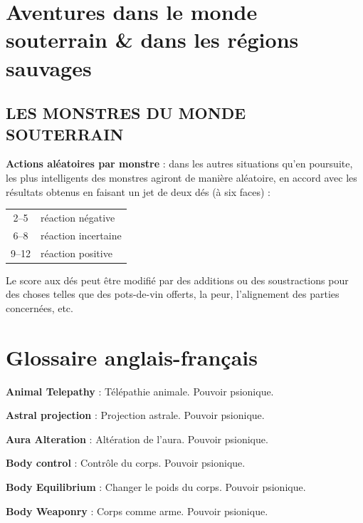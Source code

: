 \documentclass[11pt]{article}
\begin{document}
{{}%

\newpage
\section*{Aventures dans le monde souterrain \& dans les régions sauvages}

\subsection*{LES MONSTRES DU MONDE SOUTERRAIN}

\textbf{Actions aléatoires par monstre} : dans les autres situations qu'en poursuite, les plus intelligents des monstres agiront de manière aléatoire, en accord avec les résultats obtenus en faisant un jet de deux dés (à six faces) :

\bigskip

{\parindent6cm \begin{tabular}{cl}
2--5 & réaction négative \\
6--8 & réaction incertaine \\
9--12 & réaction positive \\
\end{tabular}}

\medskip

Le score aux dés peut être modifié par des additions ou des soustractions pour des choses telles que des pots-de-vin offerts, la peur, l'alignement des parties concernées, etc.


\newpage
\section*{Glossaire anglais-français }

{\parindent0cm

\textbf{Animal Telepathy} : Télépathie animale. Pouvoir psionique.

\textbf{Astral projection} : Projection astrale. Pouvoir psionique.

\textbf{Aura Alteration} : Altération de l'aura. Pouvoir psionique.

\textbf{Body control} : Contrôle du corps. Pouvoir psionique.

\textbf{Body Equilibrium} : Changer le poids du corps. Pouvoir psionique.

\textbf{Body Weaponry} : Corps comme arme. Pouvoir psionique.

}}
\end{document}
